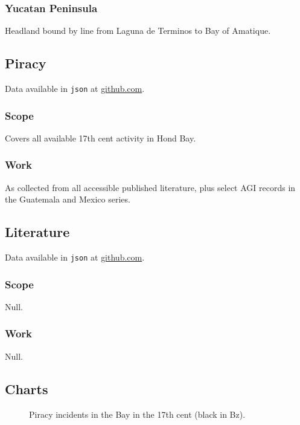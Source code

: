 \documentclass{amsart}
\newcommand{\code}[1]{\texttt{#1}}%
\theoremstyle{definition}%
\theoremstyle{definition}%
\begin{document}
\subsubsection{Yucatan Peninsula} Headland bound by line from Laguna de Terminos to Bay of Amatique.
%
%
%
%
\subsection{Piracy}%
\label{ss:piracy}
Data available in \code{json} at \href{http://github.com/aenavidad/pp-0}{github.com}.
\subsubsection{Scope} Covers all available 17th cent activity in Hond Bay.
\subsubsection{Work} As collected from all accessible published literature, plus select AGI records in the Guatemala and Mexico series.
%
%
%
%
\subsection{Literature}%
\label{ss:literature}
Data available in \code{json} at \href{http://github.com/aenavidad/pp-0}{github.com}.
\subsubsection{Scope} Null.
\subsubsection{Work} Null.
%
%
%
%
\subsection{Charts}
\label{ss:charts}
\lipsum[1][1-3]
\begin{figure}
\begin{sideways}
\end{sideways}
\caption{Piracy incidents in the Bay in the 17th cent (black in Bz).}
\label{fig1}
\end{figure}
%
%
%
% 
\end{document}
